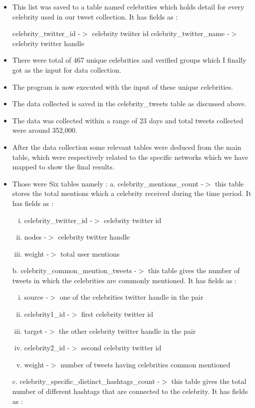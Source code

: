 \documentclass[runningheads,a4paper]{llncs}
\begin{document}
\begin{itemize}
\item This list was saved to a table named celebrities which holds detail for every celebrity used in our tweet collection. It has fields as :

\subitem	celebrity\_twitter\_id  -$>$  celebrity twiiter id
\subitem	celebrity\_twitter\_name -$>$ celebrity twitter handle

\item	There were total of 467 unique celebrities and verified groups which I finally got as the input for data collection.

\item	The program is now executed with the input of these unique celebrities.

\item	The data collected is saved in the celebrity\_tweets table as discussed above.

\item	The data was collected within a range of 23 days and total tweets collected were around 352,000.

\item	After the data collection some relevant tables were deduced from the main table, which were respectively related to the specific networks which we have mapped to show the final results.
\vspace{0.1in}
\item Those were Six tables namely : 
\vspace{0.1in}
\subitem	a. celebrity\_mentions\_count -$>$ this table stores the total mentions which a celebrity received during the time period. It has fields as : 

\begin{enumerate}[i.  ]
\addtolength{\itemindent}{1cm}
\item celebrity\_twitter\_id -$>$ celebrity twitter id
\item nodes -$>$ celebrity twitter handle
\item weight -$>$ total user mentions
\end{enumerate}
\vspace{0.1in}
\subitem b. celebrity\_common\_mention\_tweets -$>$ this table gives the number of tweets in which the celebrities are commonly mentioned. It has fields as :

\begin{enumerate}[i.  ]
\addtolength{\itemindent}{1cm}
\item source -$>$ one of the celebrities twitter handle in the pair
\item celebrity1\_id -$>$ first celebrity twitter id
\item target -$>$ the other celebrity twitter handle in the pair
\item celebrity2\_id -$>$ second celebrity twitter id
\item weight -$>$ number of tweets having celebrities common mentioned
\end{enumerate}
\vspace{0.1in}
\subitem  c. celebrity\_specific\_distinct\_hashtags\_count -$>$ this table gives the total number of different hashtags that are connected to the celebrity. It has fields as :


\end{itemize}
\end{document}

